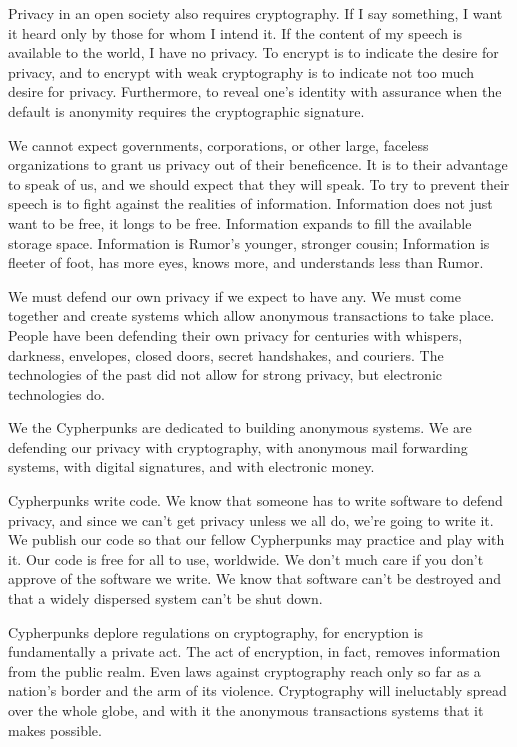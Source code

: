 \documentclass[letterpaper,12pt,english]{sphinxmanual}
\begin{document}
Privacy in an open society also requires cryptography. If I say something, I want it heard only by those for whom I intend it. If the content of my speech is available to the world, I have no privacy. To encrypt is to indicate the desire for privacy, and to encrypt with weak cryptography is to indicate not too much desire for privacy. Furthermore, to reveal one's identity with assurance when the default is anonymity requires the cryptographic signature.

We cannot expect governments, corporations, or other large, faceless organizations to grant us privacy out of their beneficence. It is to their advantage to speak of us, and we should expect that they will speak. To try to prevent their speech is to fight against the realities of information. Information does not just want to be free, it longs to be free. Information expands to fill the available storage space. Information is Rumor's younger, stronger cousin; Information is fleeter of foot, has more eyes, knows more, and understands less than Rumor.

We must defend our own privacy if we expect to have any. We must come together and create systems which allow anonymous transactions to take place. People have been defending their own privacy for centuries with whispers, darkness, envelopes, closed doors, secret handshakes, and couriers. The technologies of the past did not allow for strong privacy, but electronic technologies do.

We the Cypherpunks are dedicated to building anonymous systems. We are defending our privacy with cryptography, with anonymous mail forwarding systems, with digital signatures, and with electronic money.

Cypherpunks write code. We know that someone has to write software to defend privacy, and since we can't get privacy unless we all do, we're going to write it. We publish our code so that our fellow Cypherpunks may practice and play with it. Our code is free for all to use, worldwide. We don't much care if you don't approve of the software we write. We know that software can't be destroyed and that a widely dispersed system can't be shut down.

Cypherpunks deplore regulations on cryptography, for encryption is fundamentally a private act. The act of encryption, in fact, removes information from the public realm. Even laws against cryptography reach only so far as a nation's border and the arm of its violence. Cryptography will ineluctably spread over the whole globe, and with it the anonymous transactions systems that it makes possible.
\end{document}
